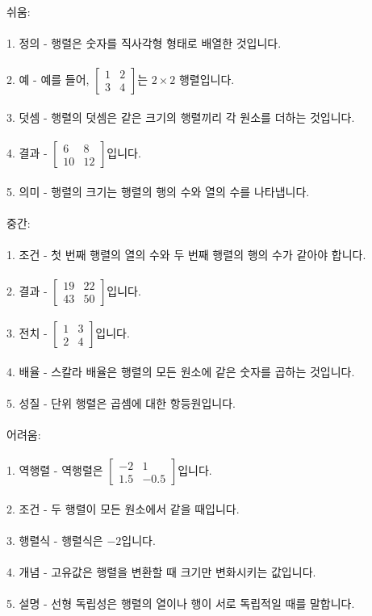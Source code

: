 \documentclass[fleqn]{article}
\begin{document}
      
       \\\\

쉬움: \\\\
1. 정의 - 행렬은 숫자를 직사각형 형태로 배열한 것입니다. \\\\
2. 예 - 예를 들어, \(\begin{bmatrix} 1 & 2 \\ 3 & 4 \end{bmatrix}\)는 \(2 \times 2\) 행렬입니다. \\\\
3. 덧셈 - 행렬의 덧셈은 같은 크기의 행렬끼리 각 원소를 더하는 것입니다. \\\\
4. 결과 - \(\begin{bmatrix} 6 & 8 \\ 10 & 12 \end{bmatrix}\)입니다. \\\\
5. 의미 - 행렬의 크기는 행렬의 행의 수와 열의 수를 나타냅니다. \\\\

중간: \\\\
1. 조건 - 첫 번째 행렬의 열의 수와 두 번째 행렬의 행의 수가 같아야 합니다. \\\\
2. 결과 - \(\begin{bmatrix} 19 & 22 \\ 43 & 50 \end{bmatrix}\)입니다. \\\\
3. 전치 - \(\begin{bmatrix} 1 & 3 \\ 2 & 4 \end{bmatrix}\)입니다. \\\\
4. 배율 - 스칼라 배율은 행렬의 모든 원소에 같은 숫자를 곱하는 것입니다. \\\\
5. 성질 - 단위 행렬은 곱셈에 대한 항등원입니다. \\\\

어려움: \\\\
1. 역행렬 - 역행렬은 \(\begin{bmatrix} -2 & 1 \\ 1.5 & -0.5 \end{bmatrix}\)입니다. \\\\
2. 조건 - 두 행렬이 모든 원소에서 같을 때입니다. \\\\
3. 행렬식 - 행렬식은 \(-2\)입니다. \\\\
4. 개념 - 고유값은 행렬을 변환할 때 크기만 변화시키는 값입니다. \\\\
5. 설명 - 선형 독립성은 행렬의 열이나 행이 서로 독립적일 때를 말합니다. \\\\      
      
\end{document}
